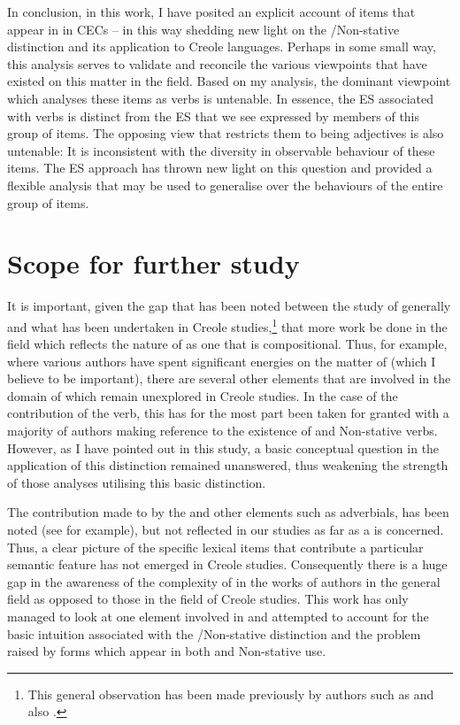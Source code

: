 In conclusion, in this work, I have posited an explicit account of items that appear in  in CECs -- in this way shedding new light on the \slash Non-stative distinction and its application to Creole languages. Perhaps in some small way, this analysis serves to validate and reconcile the various viewpoints that have existed on this matter in the field. Based on my analysis, the dominant viewpoint which analyses these items as  verbs is untenable. In essence, the ES associated with  verbs is distinct from the ES that we see expressed by members of this group of items. The opposing view that restricts them to being adjectives is also untenable: It is inconsistent with the diversity in observable behaviour of these items. The ES approach has thrown new light on this question and provided a flexible analysis that may be used to generalise over the behaviours of the entire group of items. 


\section{Scope for further study}\label{sec:6.3}

It is important, given the gap that has been noted between the study of  generally and what has been undertaken in Creole studies,\footnote{This general observation has been made previously by authors such as \citet{Winford1993,Winford1997,Winford2001} and also \citet{Dahl1993}.} that more work be done in the field which reflects the nature of  as one that is compositional. Thus, for example, where various authors have spent significant energies on the matter of  (which I believe to be important), there are several other elements that are involved in the domain of  which remain unexplored in Creole studies. In the case of the contribution of the verb, this has for the most part been taken for granted with a majority of authors making reference to the existence of  and Non-stative verbs. However, as I have pointed out in this study, a basic conceptual question in the application of this distinction remained unanswered, thus weakening the strength of those analyses utilising this basic distinction. 

The contribution made to  by the  and other elements such as adverbials, has been noted (see \citealt{Jaganauth1987} for example), but not reflected in our studies as far as a  is concerned. Thus, a clear picture of the specific lexical items that contribute a particular semantic feature has not emerged in Creole studies. Consequently there is a huge gap in the awareness of the complexity of  in the works of authors in the general field as opposed to those in the field of Creole studies. This work has only managed to look at one element involved in  and attempted to account for the basic intuition associated with the \slash Non-stative distinction and the problem raised by forms which appear in both  and Non-stative use. 


